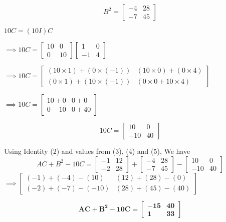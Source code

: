 \documentclass[journal,12pt,twocolumn]{IEEEtran}
\begin{document}
      \begin{equation}
      \boxed{B^2=
      \begin{bmatrix}
        -4 & 28 \\
        -7 & 45 
      \end{bmatrix}
      }
    \end{equation}
    
      $
      10C=(10I)C 
      $

      $\implies 10C=
      \begin{bmatrix}
        10 & 0 \\
        0 & 10
      \end{bmatrix}
      \begin{bmatrix}
        1 & 0 \\
        -1 & 4
      \end{bmatrix}
      $

      $\implies 10C=
      \begin{bmatrix}
        (10\times1)+(0\times(-1)) & (10\times0)+(0\times4) \\
        (0\times1)+(10\times(-1)) & (0\times0+10\times4)
      \end{bmatrix}
      $

      $\implies 10C=
      \begin{bmatrix}
        10+0 & 0+0 \\
        0-10 & 0+40
      \end{bmatrix}
      $

      \begin{equation}
      \boxed{10C=
      \begin{bmatrix}
        10 & 0 \\
        -10 & 40
      \end{bmatrix}
      }
    \end{equation}
  
    Using Identity (2) and values from (3), (4) and (5), We have
    $$
      AC+B^2-10C= 
      \begin{bmatrix}
        -1 & 12 \\
        -2 & 28
      \end{bmatrix}
      +
      \begin{bmatrix}
        -4 & 28 \\
        -7 & 45
      \end{bmatrix}
      -
      \begin{bmatrix}
        10 & 0 \\
        -10 & 40
      \end{bmatrix}
    $$
    $\implies
      \begin{bmatrix}
        (-1)+(-4)-(10) & (12)+(28)-(0) \\
        (-2)+(-7)-(-10) & (28)+(45)-(40)
      \end{bmatrix}
    $
    
    \begin{equation}
      \boxed{\mathbf{AC+B^2-10C} =
        \begin{bmatrix}
          \mathbf{-15} & \mathbf{40} \\
          \mathbf{1} & \mathbf{33}
        \end{bmatrix}
        }  
    \end{equation}
\end{document}
